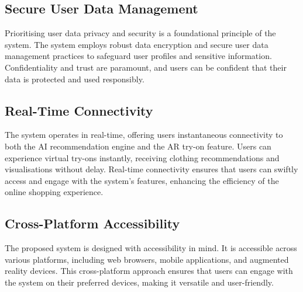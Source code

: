 	\subsection{Secure User Data Management}
		Prioritising user data privacy and security is a foundational principle of the system. The system employs robust data encryption and secure user data management practices to safeguard user profiles and sensitive information. Confidentiality and trust are paramount, and users can be confident that their data is protected and used responsibly.

	\subsection{Real-Time Connectivity}
		The system operates in real-time, offering users instantaneous connectivity to both the AI recommendation engine and the AR try-on feature. Users can experience virtual try-ons instantly, receiving clothing recommendations and visualisations without delay. Real-time connectivity ensures that users can swiftly access and engage with the system's features, enhancing the efficiency of the online shopping experience.

	\subsection{Cross-Platform Accessibility}
		The proposed system is designed with accessibility in mind. It is accessible across various platforms, including web browsers, mobile applications, and augmented reality devices. This cross-platform approach ensures that users can engage with the system on their preferred devices, making it versatile and user-friendly.
